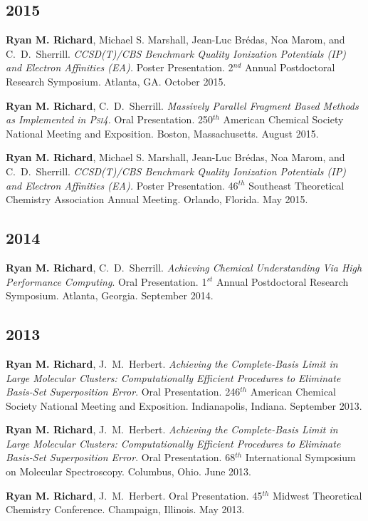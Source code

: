 \begin{etaremune}
	\subsection{2015}
	\item{\textbf{Ryan M. Richard}, Michael S. Marshall, Jean-Luc Br{\' e}das,
	      Noa Marom, and C.~D.~Sherrill. {\em CCSD(T)/CBS Benchmark Quality
		  Ionization Potentials (IP) and Electron Affinities (EA).} Poster
		  Presentation.  2$^{nd}$ Annual Postdoctoral Research Symposium.
		  Atlanta, GA. October 2015.}
	\item{\textbf{Ryan M. Richard}, C.~D.~Sherrill.  {\em Massively Parallel
	      Fragment Based Methods as Implemented in \textsc{Psi4}.} Oral
		  Presentation.  250$^{th}$ American Chemical Society National Meeting
		  and Exposition. Boston, Massachusetts. August 2015.}
	\item{\textbf{Ryan M. Richard}, Michael S. Marshall, Jean-Luc Br{\' e}das,
	      Noa Marom, and C.~D.~Sherrill. {\em CCSD(T)/CBS Benchmark Quality
		  Ionization Potentials (IP) and Electron Affinities (EA).} Poster
		  Presentation.  46$^{th}$ Southeast Theoretical Chemistry Association
		  Annual Meeting.  Orlando, Florida. May 2015.}

	\subsection{2014}
	\item{\textbf{Ryan M. Richard}, C.~D.~Sherrill. {\em Achieving Chemical
	      Understanding Via High Performance Computing}. Oral Presentation.
		  1$^{st}$ Annual Postdoctoral Research Symposium.  Atlanta, Georgia.
		  September 2014.}

	\subsection{2013}
	\item{\textbf{Ryan M. Richard}, J.~M.~Herbert.  {\em Achieving the
		  Complete-Basis Limit in Large Molecular Clusters: Computationally
		  Efficient Procedures to Eliminate Basis-Set Superposition Error}.
		  Oral Presentation.  246$^{th}$ American Chemical Society National
		  Meeting and Exposition.  Indianapolis, Indiana.  September 2013.}
	\item{\textbf{Ryan M. Richard}, J.~M.~Herbert.  {\em Achieving the
	      Complete-Basis Limit in Large Molecular Clusters: Computationally
		  Efficient Procedures to Eliminate Basis-Set Superposition Error}.
		  Oral Presentation.  68$^{th}$ International Symposium on Molecular
		  Spectroscopy.  Columbus, Ohio. June 2013.}
	\item{\textbf{Ryan M. Richard}, J.~M.~Herbert. Oral Presentation.
	      45$^{th}$ Midwest Theoretical Chemistry Conference.  Champaign,
		  Illinois.  May 2013.}


\end{etaremune}
